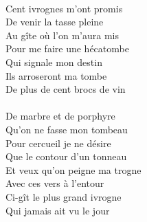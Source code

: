 {\\Cent ivrognes m'ont promis
\\De venir la tasse pleine
\\Au gîte où l'on m'aura mis
\\Pour me faire une hécatombe
\\Qui signale mon destin
\\Ils arroseront ma tombe
\\De plus de cent brocs de vin
\\\\De marbre et de porphyre
\\Qu'on ne fasse mon tombeau
\\Pour cercueil je ne désire
\\Que le contour d'un tonneau
\\Et veux qu'on peigne ma trogne
\\Avec ces vers à l'entour
\\Ci-gît le plus grand ivrogne
\\Qui jamais ait vu le jour 
}
\breakpage